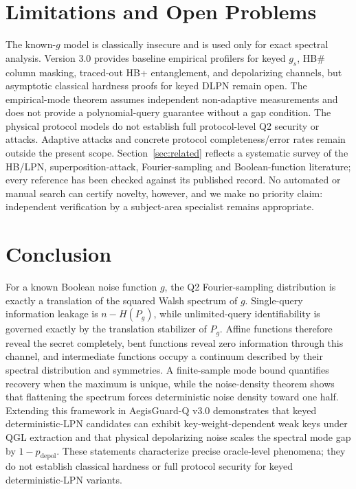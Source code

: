 \documentclass[10pt,twocolumn]{article}
\theoremstyle{definition}
\begin{document}
\section{Limitations and Open Problems}\label{sec:limits}

The known-$g$ model is classically insecure and is used only for exact spectral analysis. Version 3.0 provides baseline empirical profilers for keyed $g_s$, HB\# column masking, traced-out HB+ entanglement, and depolarizing channels, but asymptotic classical hardness proofs for keyed DLPN remain open. The empirical-mode theorem assumes independent non-adaptive measurements and does not provide a polynomial-query guarantee without a gap condition. The physical protocol models do not establish full protocol-level Q2 security or attacks. Adaptive attacks and concrete protocol completeness/error rates remain outside the present scope. Section~\ref{sec:related} reflects a systematic survey of the HB/LPN, superposition-attack, Fourier-sampling and Boolean-function literature; every reference has been checked against its published record. No automated or manual search can certify novelty, however, and we make no priority claim: independent verification by a subject-area specialist remains appropriate.

\section{Conclusion}

For a known Boolean noise function $g$, the Q2 Fourier-sampling distribution is exactly a translation of the squared Walsh spectrum of $g$. Single-query information leakage is $n - H(P_g)$, while unlimited-query identifiability is governed exactly by the translation stabilizer of $P_g$. Affine functions therefore reveal the secret completely, bent functions reveal zero information through this channel, and intermediate functions occupy a continuum described by their spectral distribution and symmetries. A finite-sample mode bound quantifies recovery when the maximum is unique, while the noise-density theorem shows that flattening the spectrum forces deterministic noise density toward one half. Extending this framework in AegisGuard-Q v3.0 demonstrates that keyed deterministic-LPN candidates can exhibit key-weight-dependent weak keys under QGL extraction and that physical depolarizing noise scales the spectral mode gap by $1 - p_{\mathrm{depol}}$. These statements characterize precise oracle-level phenomena; they do not establish classical hardness or full protocol security for keyed deterministic-LPN variants.
\end{document}

